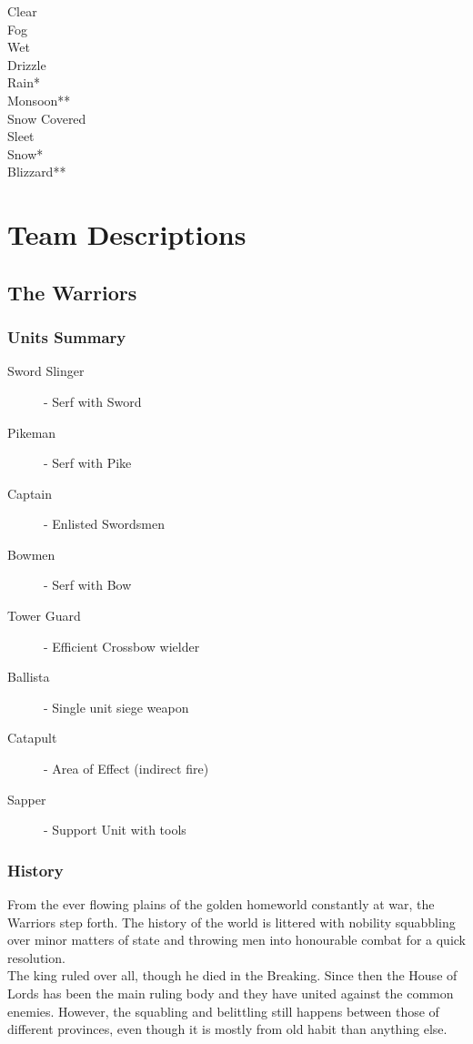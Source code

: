 \documentclass[a4paper,twocolumn]{article}
\begin{document}
Clear\\
Fog\\

Wet\\
Drizzle\\
Rain*\\
Monsoon**\\

Snow Covered\\
Sleet\\
Snow*\\
Blizzard**\\



\newpage \section{Team Descriptions}

\subsection{The Warriors}

\subsubsection{Units Summary}

\begin{description}
\item[Sword Slinger]- Serf with Sword
\item[Pikeman]- Serf with Pike
\item[Captain]- Enlisted Swordsmen

\item[Bowmen]- Serf with Bow
\item[Tower Guard]- Efficient Crossbow wielder

\item[Ballista]- Single unit siege weapon
\item[Catapult]- Area of Effect (indirect fire)

\item[Sapper]- Support Unit with tools
\end{description}

\subsubsection{History}

From the ever flowing plains of the golden homeworld constantly at war, the Warriors step forth. The history of the world is littered with nobility squabbling over minor matters of state and throwing men into honourable combat for a quick resolution.\\
The king ruled over all, though he died in the Breaking. Since then the House of Lords has been the main ruling body and they have united against the common enemies. However, the squabling and belittling still happens between those of different provinces, even though it is mostly from old habit than anything else.
\end{document}
